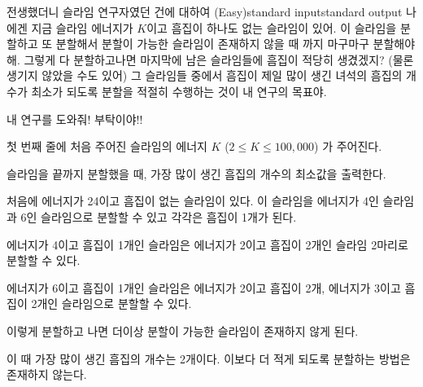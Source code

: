 \begin{problem}{전생했더니 슬라임 연구자였던 건에 대하여 (Easy)}{standard input}{standard output}
나에겐 지금 슬라임 에너지가 $K$이고 흠집이 하나도 없는 슬라임이 있어.
이 슬라임을 분할하고 또 분할해서 분할이 가능한 슬라임이 존재하지 않을 때 까지 마구마구 분할해야해.
그렇게 다 분할하고나면 마지막에 남은 슬라임들에 흠집이 적당히 생겼겠지?
(물론 생기지 않았을 수도 있어)
그 슬라임들 중에서 흠집이 제일 많이 생긴 녀석의 흠집의 개수가 최소가 되도록
분할을 적절히 수행하는 것이 내 연구의 목표야.

내 연구를 도와줘! 부탁이야!!

\InputFile
첫 번째 줄에 처음 주어진 슬라임의 에너지 $K$ ($2 \le K \le 100,000$) 가 주어진다.

\OutputFile
슬라임을 끝까지 분할했을 때, 가장 많이 생긴 흠집의 개수의 최소값을 출력한다.

\Example

\begin{example}
%
%
%
\end{example}

\Notes
처음에 에너지가 24이고 흠집이 없는 슬라임이 있다.
이 슬라임을 에너지가 4인 슬라임과 6인 슬라임으로 분할할 수 있고 각각은 흠집이 1개가 된다.

에너지가 4이고 흠집이 1개인 슬라임은 에너지가 2이고 흠집이 2개인 슬라임 2마리로 분할할 수 있다.

에너지가 6이고 흠집이 1개인 슬라임은 에너지가 2이고 흠집이 2개, 에너지가 3이고 흠집이 2개인 슬라임으로 분할할 수 있다.

이렇게 분할하고 나면 더이상 분할이 가능한 슬라임이 존재하지 않게 된다.

이 때 가장 많이 생긴 흠집의 개수는 2개이다. 이보다 더 적게 되도록 분할하는 방법은 존재하지 않는다.

\end{problem}
